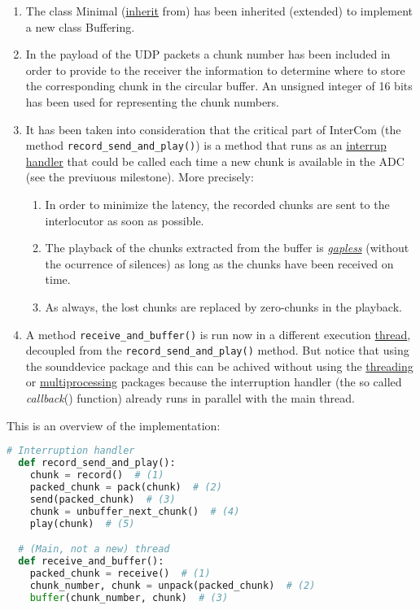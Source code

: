 \begin{enumerate}
\item The class Minimal
  (\href{https://en.wikipedia.org/wiki/Inheritance_(object-oriented_programming)}{inherit}
  from) has been inherited (extended) to implement a new class
  Buffering.
\item In the payload of the UDP packets a chunk number has been
  included in order to provide to the receiver the information to
  determine where to store the corresponding chunk in the circular
  buffer. An unsigned integer of 16 bits has been used for
  representing the chunk numbers.
\item It has been taken into consideration that the critical part of
  InterCom (the method \verb|record_send_and_play()|) is a method that
  runs as an
  \href{https://en.wikipedia.org/wiki/Interrupt_handler}{interrup
    handler} that could be called each time a new chunk is available
  in the ADC (see the previuous milestone). More precisely:
  \begin{enumerate}
  \item In order to minimize the latency, the recorded chunks are sent
    to the interlocutor as soon as possible.
  \item The playback of the chunks extracted from the buffer is
    \href{https://en.wikipedia.org/wiki/Gapless_playback}{\emph{gapless}}
    (without the ocurrence of silences) as long as the chunks have
    been received on time.
  \item As always, the lost chunks are replaced by zero-chunks
    in the playback.
  \end{enumerate}
\item A method \verb|receive_and_buffer()| is run now in a different
  execution
  \href{https://en.wikipedia.org/wiki/Thread_(computing)}{thread},
  decoupled from the \verb|record_send_and_play()| method. But notice
  that using the sounddevice package and this can be achived without using the
  \href{https://docs.python.org/3/library/threading.html}{threading}
  or
  \href{https://docs.python.org/3/library/multiprocessing.html}{multiprocessing}
  packages because the interruption handler (the so called
  \emph{callback}() function) already runs in parallel with the main
  thread.
\end{enumerate}

This is an overview of the implementation:

\begin{lstlisting}[language=Python]
  # Interruption handler
  def record_send_and_play():
    chunk = record()  # (1)
    packed_chunk = pack(chunk)  # (2)
    send(packed_chunk)  # (3)
    chunk = unbuffer_next_chunk()  # (4)
    play(chunk)  # (5)

  # (Main, not a new) thread
  def receive_and_buffer():
    packed_chunk = receive()  # (1)
    chunk_number, chunk = unpack(packed_chunk)  # (2)
    buffer(chunk_number, chunk)  # (3)
\end{lstlisting}

